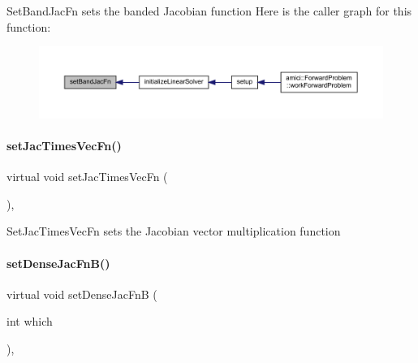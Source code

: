 Set\+Band\+Jac\+Fn sets the banded Jacobian function Here is the caller graph for this function\+:
\nopagebreak
\begin{figure}[H]
\begin{center}
\leavevmode
\includegraphics[width=350pt]{classamici_1_1_solver_a1ac4c2c1cf9df3c478ade2b1d5e728c6_icgraph}
\end{center}
\end{figure}
\mbox{\label{classamici_1_1_solver_a151ebe8ad33f1e635289c869d1412375}} 
\paragraph{\texorpdfstring{set\+Jac\+Times\+Vec\+Fn()}{setJacTimesVecFn()}}
{\footnotesize\ttfamily virtual void set\+Jac\+Times\+Vec\+Fn (\begin{DoxyParamCaption}{ }\end{DoxyParamCaption})\hspace{0.3cm}{\ttfamily [protected]}, {}}

Set\+Jac\+Times\+Vec\+Fn sets the Jacobian vector multiplication function \mbox{\label{classamici_1_1_solver_a1081b1ac835a2bf9221552a07d04ef4d}} 
\paragraph{\texorpdfstring{set\+Dense\+Jac\+Fn\+B()}{setDenseJacFnB()}}
{\footnotesize\ttfamily virtual void set\+Dense\+Jac\+FnB (\begin{DoxyParamCaption}\item[{int}]{which }\end{DoxyParamCaption})\hspace{0.3cm}{\ttfamily [protected]}, {}}

